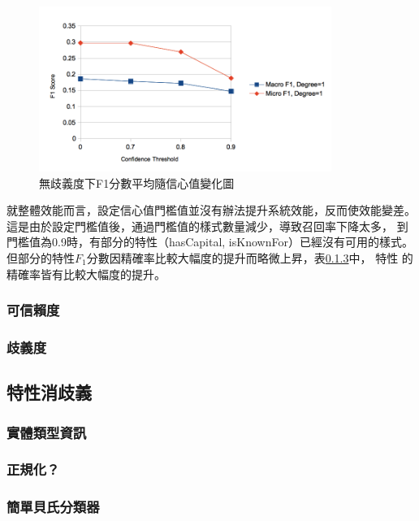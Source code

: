 \begin{figure}
    \centering
    \includegraphics[width=0.85\textwidth]{images/04-conf-f1}
    \caption{無歧義度下F1分數平均隨信心值變化圖}
    \label{i:conf-f1}
\end{figure}

就整體效能而言，設定信心值門檻值並沒有辦法提升系統效能，反而使效能變差。
這是由於設定門檻值後，通過門檻值的樣式數量減少，導致召回率下降太多，
到門檻值為0.9時，有部分的特性（hasCapital, isKnownFor）已經沒有可用的樣式。
但部分的特性$F_1$分數因精確率比較大幅度的提升而略微上昇，表\ref{}中，
特性%
的精確率皆有比較大幅度的提升。


\subsubsection{可信賴度}


\subsubsection{歧義度}

\subsection{特性消歧義}
\subsubsection{實體類型資訊}
\subsubsection{正規化？}
\subsubsection{簡單貝氏分類器}
